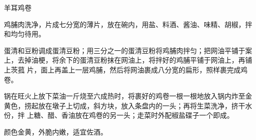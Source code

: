 %
%
%
%
%
%
%
\begin{recipe}{羊耳鸡卷}

\ingredients


\preparation

\step 鸡脯肉洗净，片成七分宽的薄片，放在碗内，用盐、料酒、酱油、味精、胡椒，拌
和均匀待用。

\step 蛋清和豆粉调成蛋清豆粉；用三分之一的蛋清豆粉将鸡脯肉拌匀；把网油平铺于案
上，去掉油梗，将余下的蛋清豆粉抹在网油上，将拌好的鸡脯平铺于网油上，再铺上茨菰
片，面上再盖上一层鸡脯，然后将网油裹成八分宽的扁形，照样裹完成鸡卷。

\step 锅在旺火上放下菜油一斤烧至六成热时，将裹好的鸡卷一根一根地放入锅内炸至金
黄色，捞起放在墩子上切成，斜方块，放入条盘内的一头；再将生菜洗净，挤干水份，拌
上糖、醋、香油放在鸡卷的另一头；走菜时外配椒盐碟子一个即成。

\features

颜色金黄，外脆内嫩，适宜佐酒。

\end{recipe}

